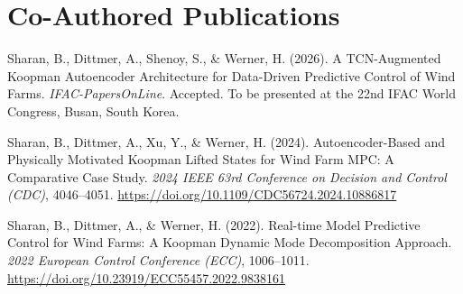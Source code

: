 \section*{Co-Authored Publications}

\begin{description}[leftmargin=0pt]
    
    \item Sharan, B., Dittmer, A., Shenoy, S., \& Werner, H. (2026).
    A {TCN}-Augmented Koopman Autoencoder Architecture for
    Data-Driven Predictive Control of Wind Farms.
    \textit{IFAC-PapersOnLine}.
    Accepted. To be presented at the 22nd IFAC World Congress, Busan, South Korea.
    
    \item Sharan, B., Dittmer, A., Xu, Y., \& Werner, H. (2024).
    Autoencoder-Based and Physically Motivated Koopman Lifted States
    for Wind Farm MPC: A Comparative Case Study.
    \textit{2024 IEEE 63rd Conference on Decision and Control (CDC)}, 4046--4051.
    \url{https://doi.org/10.1109/CDC56724.2024.10886817}
    
    \item Sharan, B., Dittmer, A., \& Werner, H. (2022).
    Real-time Model Predictive Control for Wind Farms:
    A Koopman Dynamic Mode Decomposition Approach.
    \textit{2022 European Control Conference (ECC)}, 1006--1011.
    \url{https://doi.org/10.23919/ECC55457.2022.9838161}
    
\end{description}